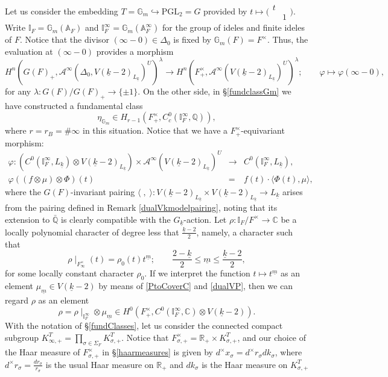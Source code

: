 \documentclass{amsart}
\theoremstyle{definition}
\theoremstyle{remark}
\numberwithin{equation}{section}
\newcommand{\PGL}{{\mathrm{PGL}}}
\newcommand{\A}{{\mathbb A}}
\newcommand{\Q}{{\mathbb Q}}
\newcommand{\C}{{\mathbb C}}
\newcommand{\R}{{\mathbb R}}
\newcommand{\G}{{\mathbb G}}
\newcommand{\I}{{\mathbb I}}
\newcommand{\cA}{{\mathcal A}}
\begin{document}
Let us consider the embedding $T=\G_m\hookrightarrow \PGL_2=G$ provided by $t\mapsto\big(\begin{smallmatrix}
    t&\\&1
\end{smallmatrix}\big)$. Write $\I_F=\G_m(\A_F)$ and $\I_F^\infty=\G_m(\A_F^\infty)$ for the group of ideles and finite ideles of $F$. Notice that the divisor $(\infty-0)\in\Delta_0$ is fixed by $\G_m(F)=F^\times$. Thus, the evaluation at $(\infty-0)$ provides a morphism
\[
H^{n}(G(F)_+,\cA^{\infty}(\Delta_0,V(\underline k-2)_{L_{\underline k}})^{U})^{\lambda}\longrightarrow H^{n}(F_+^\times,\cA^{\infty}(V(\underline k-2)_{L_{\underline k}})^{U})^{\lambda};\qquad \varphi\longmapsto \varphi(\infty-0),
\]
for any $\lambda:G(F)/G(F)_+\rightarrow \{\pm 1\}$.  On the other side, in \S \ref{fundclassGm} we have constructed a fundamental class 
\[
    \eta_{\G_m}\in H_{r-1}(F_+^\times,C_c^0(\I_F^\infty,\Q)),
\]
where $r=r_{B}=\#\infty$ in this situation.
Notice that we have a $F_+^\times$-equivariant morphism:
\begin{eqnarray}\label{firstvarphi}
\varphi:\left(C^{0}(\I_F^\infty,{L_{\underline k}})\otimes V(\underline{k}-2)_{L_{\underline k}}\right)\times \cA^{\infty}(V(\underline{k}-2)_{L_{\underline k}})^U&\longrightarrow& C^{0}(\I_F^\infty,{L_{\underline k}}),\\
\varphi((f\otimes \mu)\otimes\Phi)(t)&=&f(t)\cdot\langle\Phi(t),\mu\rangle,
\end{eqnarray}
where the $G(F)$-invariant pairing $\langle\;,\;\rangle:V(\underline{k}-2)_{L_{\underline k}}\times V(\underline{k}-2)_{L_{\underline k}}\rightarrow {L_{\underline k}}$ arises from the pairing defined in Remark \ref{dualVkmodelpairing}, noting that its extension to $\bar\Q$  is clearly compatible with the $G_{\underline k}$-action.
Let $\rho:\I_F/F^\times\rightarrow\C$ be a locally polynomial character of degree less that $\frac{\underline k-2}{2}$, namely, a character such that 
\[
\rho\mid_{F_\infty^\times}(t)=\rho_0(t)t^{\underline m};\qquad \frac{2-\underline k}{2}\leq\underline m\leq \frac{\underline k-2}{2},
\]
for some locally constant character $\rho_0$. If we interpret the function $t\mapsto t^{\underline m}$ as an element $\mu_{\underline m}\in V(\underline{k}-2)$ by means of \eqref{PtoCoverC} and \eqref{dualVP}, then we can regard $\rho$ as an element
\[
\rho=\rho\mid_{\I_F^\infty}\otimes\mu_{\underline m} \in H^0(F^\times_+,C^{0}(\I_F^\infty,\C)\otimes V(\underline{k}-2)).
\]
With the notation of \S \ref{fundClasses}, let us consider the connected compact subgroup $K^T_{\infty,+}=\prod_{\sigma\in\Sigma_F}K_{\sigma,+}^{T}$. Notice that $F^\times_{\sigma,+}=\R_+\times K_{\sigma,+}^{T}$, and our choice of the Haar measure of  $F^\times_{\sigma,+}$ in \S \ref{haarmeasures} is given by $d^\times x_\sigma=d^\times r_\sigma d k_\sigma$, where $d^\times r_\sigma=\frac{dr_\sigma}{r_\sigma}$ is the usual Haar measure on $\R_+$ and $d k_\sigma$ is the Haar measure on $K_{\sigma,+}^{T}$
\end{document}
